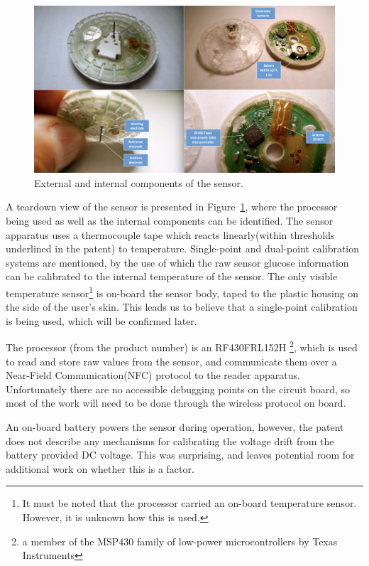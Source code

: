 \begin{figure}[ht]
\centering\includegraphics[width=1.0\linewidth]{images/libre4}
\caption{External and internal components of the sensor\cite{ilka_freestyle_2014}.}
\label{fig:libre2}
\end{figure}

A teardown view of the sensor is presented in Figure~\ref{fig:libre2}, where the processor being used as well as the internal components can be identified. The sensor apparatus uses a thermocouple tape\cite{noauthor_thermocouple_1971} which reacts linearly(within thresholds underlined in the patent) to temperature. Single-point and dual-point calibration systems are mentioned, by the use of which the raw sensor glucose information can be calibrated to the internal temperature of the sensor. The only visible temperature sensor\footnote{It must be noted that the processor carried an on-board temperature sensor. However, it is unknown how this is used.} is on-board the sensor body, taped to the plastic housing on the side of the user's skin. This leads us to believe that a single-point calibration is being used, which will be confirmed later.

The processor (from the product number) is an  RF430FRL152H\cite{noauthor_rf430frl152h_nodate}
\footnote{a member of the MSP430\cite{noauthor_16-bit_nodate} family of low-power microcontrollers by Texas Instruments}, which is used to read and store raw values from the sensor, and communicate them over a Near-Field Communication(NFC)\cite{noauthor_near-field_2017} protocol to the reader apparatus. Unfortunately there are no accessible debugging points on the circuit board, so most of the work will need to be done through the wireless protocol on board.

An on-board battery powers the sensor during operation, however, the patent does not describe any mechanisms for calibrating the voltage drift from the battery provided DC voltage. This was surprising, and leaves potential room for additional work on whether this is a factor.

